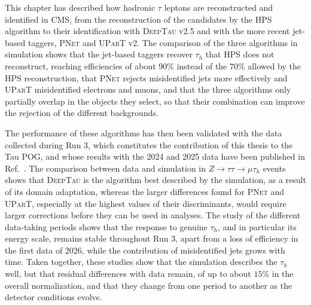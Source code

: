 \noindent This chapter has described how hadronic $\tau$ leptons are reconstructed and identified in CMS, from the reconstruction of the candidates by the HPS algorithm to their identification with \textsc{DeepTau} v2.5 and with the more recent jet-based taggers, \textsc{PNet} and \textsc{UParT} v2. The comparison of the three algorithms in simulation shows that the jet-based taggers recover $\tau_h$ that HPS does not reconstruct, reaching efficiencies of about $90\%$ instead of the $70\%$ allowed by the HPS reconstruction, that \textsc{PNet} rejects misidentified jets more effectively and \textsc{UParT} misidentified electrons and muons, and that the three algorithms only partially overlap in the objects they select, so that their combination can improve the rejection of the different backgrounds.

The performance of these algorithms has then been validated with the data collected during Run 3, which constitutes the contribution of this thesis to the Tau POG, and whose results with the 2024 and 2025 data have been published in Ref.~\cite{CMS-DP-2025-074}. The comparison between data and simulation in $Z\to\tau\tau\to\mu\tau_h$ events shows that \textsc{DeepTau} is the algorithm best described by the simulation, as a result of its domain adaptation, whereas the larger differences found for \textsc{PNet} and \textsc{UParT}, especially at the highest values of their discriminants, would require larger corrections before they can be used in analyses. The study of the different data-taking periods shows that the response to genuine $\tau_h$, and in particular its energy scale, remains stable throughout Run 3, apart from a loss of efficiency in the first data of 2026, while the contribution of misidentified jets grows with time. Taken together, these studies show that the simulation describes the $\tau_h$ well, but that residual differences with data remain, of up to about $15\%$ in the overall normalization, and that they change from one period to another as the detector conditions evolve.

